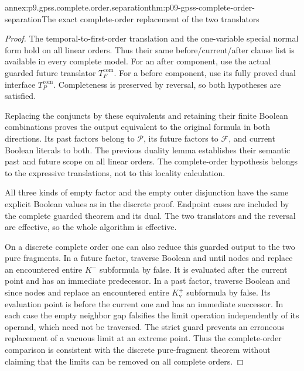 \begin{annexitem}{annex:p9.gpss.complete.order.separation}{thm:p09-gpss-complete-order-separation}{The exact complete-order replacement of the two translators}
\begin{proof}
The temporal-to-first-order
translation and the
one-variable special
normal form hold on
all linear orders.
Thus their same
before/current/after
clause list is
available in every
complete model.
For an after
component, use
the actual guarded
future translator
\(T_F^{\mathrm{com}}\).
For a before
component, use
its fully proved
dual interface
\(T_P^{\mathrm{com}}\).
Completeness is
preserved by
reversal, so
both hypotheses
are satisfied.

Replacing the
conjuncts by
these equivalents
and retaining
their finite
Boolean combinations
proves the
output equivalent
to the original
formula in both
directions.
Its past factors
belong to
\(\mathcal P\),
its future factors
to \(\mathcal F\),
and current
Boolean literals
to both.
The previous
duality lemma
establishes their
semantic past
and future
scope on all
linear orders.
The complete-order
hypothesis belongs
to the expressive
translations, not
to this locality
calculation.

All three kinds
of empty factor
and the empty
outer disjunction
have the same
explicit Boolean
values as in
the discrete
proof. Endpoint
cases are
included by
the complete
guarded theorem
and its dual.
The two translators
and the reversal
are effective,
so the whole
algorithm is
effective.

On a discrete
complete order
one can also
reduce this
guarded output
to the two
pure fragments.
In a future
factor, traverse
Boolean and
until nodes
and replace
an encountered
entire \(K^-\)
subformula by
false. It is
evaluated after
the current
point and
has an
immediate
predecessor.
In a past
factor, traverse
Boolean and
since nodes
and replace
an encountered
entire \(K^+_{\mathrm v}\)
subformula by
false. Its
evaluation point
is before the
current one
and has an
immediate
successor.
In each case
the empty
neighbor gap
falsifies the
limit operation
independently
of its operand,
which need
not be
traversed.
The strict
guard prevents
an erroneous
replacement
of a vacuous
limit at an
extreme point.
Thus the
complete-order
comparison
is consistent
with the
discrete
pure-fragment
theorem without
claiming that
the limits
can be
removed on
all complete
orders.
\end{proof}
\end{annexitem}


